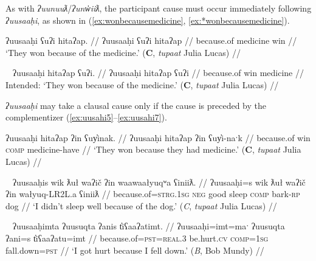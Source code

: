As with \textit{ʔuunuuƛ}/\textit{ʔunw̓iiƛ}, the participant cause must occur immediately following \textit{ʔuusaaḥi}, as shown in (\ref{ex:wonbecausemedicine}, \ref{ex:*wonbecausemedicine}).

\ex \label{ex:wonbecausemedicine}
\begingl
\glpreamble ʔuusaaḥi ʕuʔi hitaʔap. //
\gla ʔuusaaḥi ʕuʔi hitaʔap //
\glb because.of medicine win //
\glft `They won because of the medicine.' (\textbf{C}, \textit{tupaat} Julia Lucas) //
\endgl
\xe

\ex~ \label{ex:*wonbecausemedicine}
\begingl
\glpreamble *ʔuusaaḥi hitaʔap ʕuʔi. //
\gla ʔuusaaḥi hitaʔap ʕuʔi //
\glb because.of win medicine //
\glft Intended: `They won because of the medicine.' (\textbf{C}, \textit{tupaat} Julia Lucas) //
\endgl
\xe

\textit{ʔuusaaḥi} may take a clausal cause only if the cause is preceded by the complementizer (\ref{ex:uusahi5}--\ref{ex:uusahi7}).

\ex \label{ex:uusahi5}
\begingl
\glpreamble ʔuusaaḥi hitaʔap ʔin ʕuy̓inak. //
\gla ʔuusaaḥi hitaʔap ʔin ʕuy̓i-naˑk //
\glb because.of win \textsc{comp} medicine-have  //
\glft `They won because they had medicine.' (\textbf{C}, \textit{tupaat} Julia Lucas) //
\endgl
\xe

\ex~ \label{ex:uusahi6}
\begingl
\glpreamble ʔuusaaḥis wik ƛuł waʔič ʔin waawaałyuqʷa ʕiniiƛ. //
\gla ʔuusaaḥi=s wik ƛuł waʔič ʔin wałyuq-LR2L.a ʕiniiƛ //
\glb because.of=\textsc{strg.1sg} \textsc{neg} good sleep \textsc{comp} bark-\textsc{rp} dog  //
\glft `I didn't sleep well because of the dog.' (\textit{C}, \textit{tupaat} Julia Lucas) //
\endgl
\xe

\ex~ \label{ex:uusahi7}
\begingl
\glpreamble ʔuusaaḥimta ʔuusuqta ʔanis t̓iʕaaʔatimt. //
\gla ʔuusaaḥi=imt=maˑ ʔuusuqta ʔani=s t̓iʕaaʔatu=imt //
\glb because.of=\textsc{pst}=\textsc{real.3} be.hurt.\textsc{cv} \textsc{comp}=\textsc{1sg} fall.down=\textsc{pst}  //
\glft `I got hurt because I fell down.' (\textit{B}, Bob Mundy) //
\endgl
\xe

\begin{comment}
[[TODO: uusahi plus linker ]]
\textit{ʔuusaaḥi} may only be able to take the linker when it is non-initial. Both consultants with whom I attempted to add a linker to an ʔuusaaḥi-initial sentence were uncertain if it was okay or not but felt it was weird (\ref{ex:uusahi7}, \ref{ex:uusahi8}).

\ex \label{ex:uusahi7}
\begingl
\glpreamble ?? ʔuusaaḥiqḥita nay̓aqakʔi wikitaḥ ƛuł weʔič. //
\gla ʔuusaaḥi-(q)ḥ=(m)it=(m)aˑ nay̓aqak=ʔiˑ wik=(m)it=(m)aˑḥ ƛuł weʔič //
\glb because.of-\textsc{link}=\textsc{pst}=\textsc{real.3} baby=\textsc{art} \textsc{neg}=\textsc{pst}=\textsc{real.1sg} good sleep //
\glft Intended: `I didn't sleep well because of the baby.' (\textbf{B}, Bob Mundy) //
\endgl
\xe

*? ʔuusaaḥiqḥʔiš ʔuusaqta wik̓aałukʷint

ʔuusaqtumtʔiš ʔuusaaḥiqḥ wik̓aałukʷint
\end{comment}

